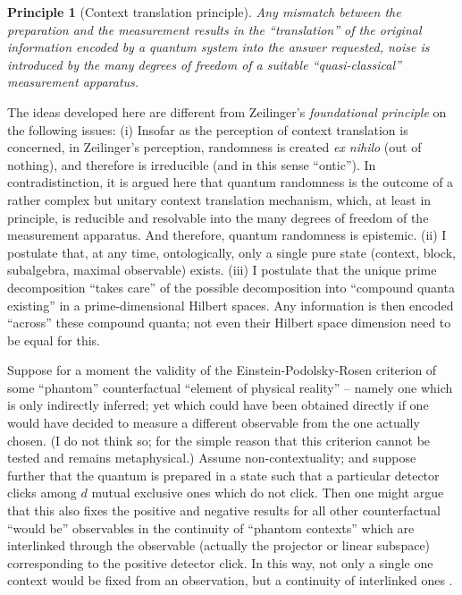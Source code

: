 \documentclass[%
  preprint,
 showpacs,
 showkeys,
 preprintnumbers,
 amsmath,amssymb,
 aps,
   pra,
  longbibliography,
 ]{revtex4-1}
\newtheorem{conjecture}[question]{Principle}
\begin{document}
{\color{blue} \begin{conjecture}[Context translation principle]
Any mismatch between the preparation and the measurement results in the ``translation''
of the original information encoded by a quantum system into the answer requested,
noise is introduced by the many degrees of freedom of a suitable ``quasi-classical'' measurement apparatus.
\end{conjecture}   }


The ideas developed here are different from Zeilinger's {\em  foundational principle} \cite{zeil-99,zeil-bruk-02,zeil-bruk-99}
on the following issues:
(i) Insofar as the perception of context translation is concerned,
in Zeilinger's perception, randomness is created {\it ex nihilo} (out of nothing), and therefore is irreducible (and in this sense ``ontic'').
In contradistinction,
it is argued here that quantum randomness is the outcome of a rather complex but unitary context translation mechanism,
which, at least in principle, is reducible and resolvable into the many degrees of freedom of the measurement apparatus.
And therefore, quantum randomness is epistemic.
(ii) I postulate that, at any time, ontologically, only a single pure state (context, block, subalgebra, maximal observable) exists.
(iii) I postulate that the unique prime decomposition ``takes care'' of the possible decomposition into ``compound quanta existing'' in a prime-dimensional Hilbert spaces.
Any information is then encoded ``across'' these compound quanta; not even their Hilbert space dimension need to be equal for this.


Suppose for a moment the validity  of the Einstein-Podolsky-Rosen \cite{epr} criterion of some ``phantom'' counterfactual ``element of physical reality''
-- namely one which is only indirectly inferred;
yet which could have been obtained directly
if one would have decided to measure a different observable from the one actually chosen.
(I do not think so; for the simple reason that this criterion cannot be tested and remains metaphysical.)
Assume non-contextuality; and
suppose further that the quantum is prepared in a state such that a particular  detector clicks among $d$ mutual exclusive ones which do not click.
Then one might argue that this also
fixes the positive and negative results for all other counterfactual ``would be''
observables in the continuity of ``phantom contexts''
which are interlinked through the observable (actually the projector or linear subspace)
corresponding to the positive detector click.
In this way,  not only a single one context would be fixed from an observation, but a continuity of interlinked ones
\cite{svozil:040102}.
\end{document}
